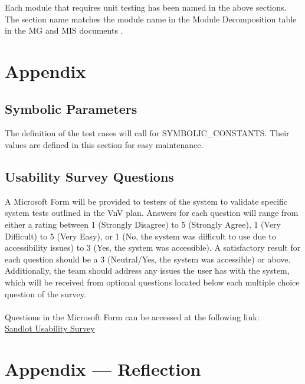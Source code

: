 \documentclass[12pt, titlepage]{article}
\begin{document}

Each module that requires unit testing has been named in the above sections.
The section name matches the module name in the Module Decomposition table in
the MG and MIS documents \cite{MG} \cite{MIS}.





\newpage

\section{Appendix}

\subsection{Symbolic Parameters}

The definition of the test cases will call for SYMBOLIC\_CONSTANTS.
Their values are defined in this section for easy maintenance.

\subsection{Usability Survey Questions}

A Microsoft Form will be provided to testers of the system to validate specific
system tests outlined in the VnV plan. Answers for each question will range from either a
rating between 1 (Strongly Disagree) to 5 (Strongly Agree), 1 (Very Difficult) to 5 (Very Easy), or
1 (No, the system was difficult to use due to accessibility issues) to 3 (Yes, the system was accessible).
A satisfactory result for each question should be a 3 (Neutral/Yes, the system was accessible) or above.
Additionally, the team should address any issues the user has with the system, which will be received
from optional questions located below each multiple choice question of the survey.
\\\\Questions in the Microsoft Form can be accessed at the following link:\\

\href{https://forms.office.com/Pages/ResponsePage.aspx?id=B2M3RCm0rUKMJSjNSW9HcodvkeIlB8lOjrmyIWuVT7dUQ0hBNFRVTjFHWVhITDIzSklZRDRYTVZRMi4u}{Sandlot Usability Survey}

\newpage{}
\section*{Appendix --- Reflection}
\end{document}
